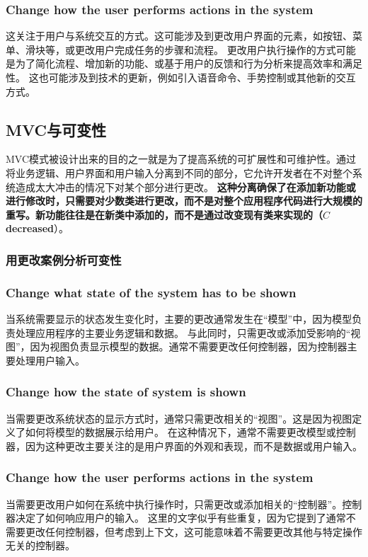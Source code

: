 \subsubsection{Change how the user performs actions in the system}
这关注于用户与系统交互的方式。这可能涉及到更改用户界面的元素，如按钮、菜单、滑块等，或更改用户完成任务的步骤和流程。
更改用户执行操作的方式可能是为了简化流程、增加新的功能、或基于用户的反馈和行为分析来提高效率和满足性。
这也可能涉及到技术的更新，例如引入语音命令、手势控制或其他新的交互方式。

\subsection{MVC与可变性}

MVC模式被设计出来的目的之一就是为了提高系统的可扩展性和可维护性。通过将业务逻辑、用户界面和用户输入分离到不同的部分，它允许开发者在不对整个系统造成太大冲击的情况下对某个部分进行更改。
\textbf{这种分离确保了在添加新功能或进行修改时，只需要对少数类进行更改，而不是对整个应用程序代码进行大规模的重写。新功能往往是在新类中添加的，而不是通过改变现有类来实现的（$C$ decreased}）。

\subsubsection{用更改案例分析可变性}

\subsubsection{Change what state of the system has to be shown}
当系统需要显示的状态发生变化时，主要的更改通常发生在“模型”中，因为模型负责处理应用程序的主要业务逻辑和数据。
与此同时，只需更改或添加受影响的“视图”，因为视图负责显示模型的数据。通常不需要更改任何控制器，因为控制器主要处理用户输入。
\subsubsection{Change how the state of system is shown}
当需要更改系统状态的显示方式时，通常只需更改相关的“视图”。这是因为视图定义了如何将模型的数据展示给用户。
在这种情况下，通常不需要更改模型或控制器，因为这种更改主要关注的是用户界面的外观和表现，而不是数据或用户输入。
\subsubsection{Change how the user performs actions in the system}
当需要更改用户如何在系统中执行操作时，只需更改或添加相关的“控制器”。控制器决定了如何响应用户的输入。
这里的文字似乎有些重复，因为它提到了通常不需要更改任何控制器，但考虑到上下文，这可能意味着不需要更改其他与特定操作无关的控制器。


